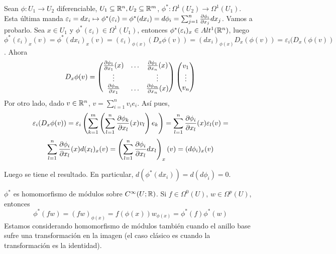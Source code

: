 \documentclass[CV.tex]{subfiles}
\begin{document}
\begin{ej}
Sean $\phi:U_1\to U_2$ diferenciable, $U_1\subseteq\mathbb{R}^n, U_2\subseteq\mathbb{R}^m$, $\phi^*:\Omega^1(U_2)\to \Omega^1(U_1)$. Esta última manda $\varepsilon_i=dx_i\mapsto \phi^*(\varepsilon_i)=\phi^*(dx_i)=d\phi_i=\sum_{j=1}^n\frac{\partial \phi_i}{\partial x_j}dx_j$. Vamos a probarlo. Sea $x\in U_1$ y $\phi^*(\varepsilon_i)\in\Omega^1(U_1)$, entonces $\phi^*(\varepsilon_i)_x\in Alt^1(\mathbb{R}^n)$, luego $\phi^*(\varepsilon_i)_x(v)=\phi^*(dx_i)_x(v)=(\varepsilon_i)_{\phi(x)}(D_x\phi(v))=(dx_i)_{\phi(x)}D_x(\phi(v))=\varepsilon_i(D_x(\phi(v))$. Ahora
\[
D_x\phi(v)=\begin{pmatrix}
\frac{\partial \phi_1}{\partial x_1}(x) & \dots & \frac{\partial \phi_1}{\partial x_n}(x)\\
\vdots & & \vdots \\
\frac{\partial \phi_m}{\partial x_1} & \dots & \frac{\partial \phi_m}{\partial x_n}(x)
\end{pmatrix}\begin{pmatrix}
v_1\\
\vdots\\
v_n
\end{pmatrix}
\]
Por otro lado, dado $v\in\mathbb{R}^n$, $v=\sum_{i=1}^nv_ie_i$. Así pues, 
\[
\varepsilon_i(D_x\phi(v))=\varepsilon_i\left(\sum_{k=1}^m\left(\sum_{l=1}^n\frac{\partial \phi_k}{\partial x_l}(x)v_l\right)e_k\right)=\sum_{l=1}^n\frac{\partial \phi_i}{\partial x_l}(x)\varepsilon_l(v)=
\]
\[
\sum_{l=1}^n\frac{\partial \phi_i}{\partial x_l}(x)d(x_l)_x(v)=\left(\sum_{l=1}^n\frac{\partial \phi_i}{\partial x_l}dx_l\right)_x(v)=(d\phi_i)_x(v)
\]

Luego se tiene el resultado. En particular, $d(\phi^*(dx_i))=d(d\phi_i)=0$. 
\end{ej}

\begin{nota}
$\phi^*$ es homomorfismo de módulos sobre $C^{\infty}(U;\mathbb{R})$. Si $f\in\Omega^0(U)$, $w\in\Omega^p(U)$, entonces 
\[
\phi^*(fw)=(fw)_{\phi(x)}=f(\phi(x))w_{\phi(x)}=\phi^*(f)\phi^*(w)
\]
Estamos considerando homomorfismo de módulos también cuando el anillo base sufre una transformación en la imagen (el caso clásico es cuando la transformación es la identidad).
\end{nota}
\end{document}
